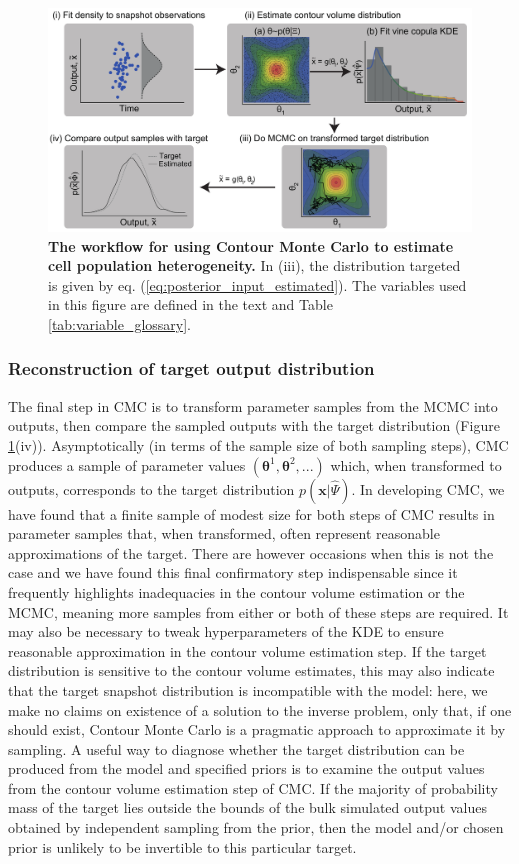 \begin{figure}[H]
	\centerline{\includegraphics[width=\textwidth]{../figures/workflow.pdf}}
	\caption{\textbf{The workflow for using Contour Monte Carlo to estimate cell population heterogeneity.} In (iii), the distribution targeted is given by eq. (\ref{eq:posterior_input_estimated}). The variables used in this figure are defined in the text and Table \ref{tab:variable_glossary}.}
	\label{fig:workflow}
\end{figure}

\subsubsection{Reconstruction of target output distribution}

The final step in CMC is to transform parameter samples from the MCMC into outputs, then compare the sampled outputs with the target distribution (Figure \ref{fig:workflow}(iv)). Asymptotically (in terms of the sample size of both sampling steps), CMC produces a sample of parameter values $(\boldsymbol{\theta}^1,\boldsymbol{\theta}^2,...)$ which, when transformed to outputs, corresponds to the target distribution $p(\boldsymbol{x}|\hat{\Psi})$. In developing CMC, we have found that a finite sample of modest size for both steps of CMC results in parameter samples that, when transformed, often represent reasonable approximations of the target. There are however occasions when this is not the case and we have found this final confirmatory step indispensable since it frequently highlights inadequacies in the contour volume estimation or the MCMC, meaning more samples from either or both of these steps are required. It may also be necessary to tweak hyperparameters of the KDE to ensure reasonable approximation in the contour volume estimation step. If the target distribution is sensitive to the contour volume estimates, this may also indicate that the target snapshot distribution is incompatible with the model: here, we make no claims on existence of a solution to the inverse problem, only that, if one should exist, Contour Monte Carlo is a pragmatic approach to approximate it by sampling. A useful way to diagnose whether the target distribution can be produced from the model and specified priors is to examine the output values from the contour volume estimation step of CMC. If the majority of probability mass of the target lies outside the bounds of the bulk simulated output values obtained by independent sampling from the prior, then the model and/or chosen prior is unlikely to be invertible to this particular target.

